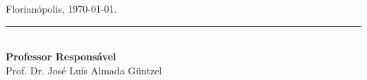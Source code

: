 	\vspace{40pt}

	\begin{flushright}

		Florianópolis, \today.
		
	\end{flushright}

	\vspace{20pt}


	\begin{center}
	    \parbox{7cm}{
	    \centering
	      \rule{6cm}{1pt}\\
	       \small \textbf{Professor Responsável}\\
	       Prof. Dr. José Luís Almada G{\"u}ntzel     
	    }
		\hfill
	\end{center}  



